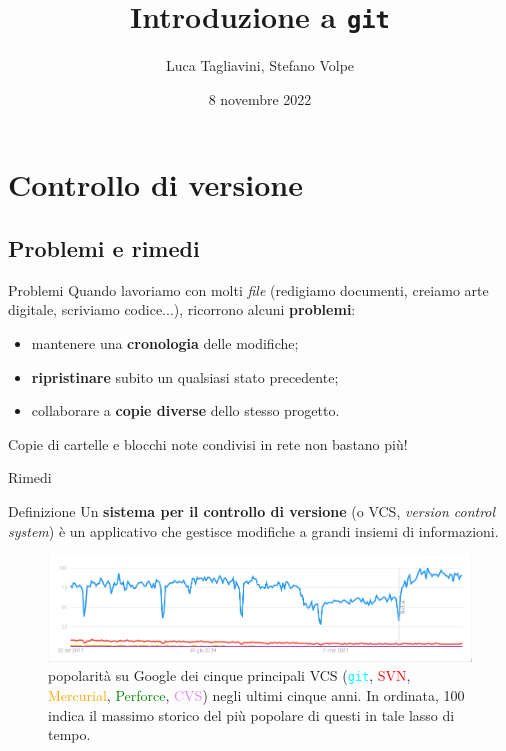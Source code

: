 \documentclass{beamer}
\title{Introduzione a \texttt{git}}
\author{Luca Tagliavini, Stefano Volpe}
\institute{Università di Bologna, corso di Laurea in Informatica}
\date{8 novembre 2022}
\begin{document}
\begin{frame} 
  \titlepage
\end{frame}

\section{Controllo di versione}

\subsection{Problemi e rimedi}
\begin{frame}{Problemi}
  Quando lavoriamo con molti \emph{file} (redigiamo documenti, creiamo arte
  digitale, scriviamo codice...), ricorrono alcuni \textbf{problemi}:\pause
  \begin{itemize}
    \item<1-> mantenere una \textbf{cronologia} delle modifiche;\pause
    \item<2-> \textbf{ripristinare} subito un qualsiasi stato precedente;\pause
    \item<3-> collaborare a \textbf{copie diverse} dello stesso progetto.\pause
  \end{itemize}
  Copie di cartelle e blocchi note condivisi in rete non bastano più!
\end{frame}

\begin{frame}{Rimedi}
  \begin{block}{Definizione}
    Un \textbf{sistema per il controllo di versione} (o VCS, \emph{version control
    system}) è un applicativo che gestisce modifiche a grandi insiemi di
    informazioni.
  \end{block}\pause
  \begin{figure}
    \includegraphics[width=\textwidth]{assets/vcs-popularity.png}
    \caption{popolarità su Google dei cinque principali VCS
    (\textcolor{cyan}{\texttt{git}}, \textcolor{red}{SVN},
    \textcolor{orange}{Mercurial}, \textcolor{green}{Perforce},
    \textcolor{violet}{CVS}) negli ultimi cinque anni. In ordinata, 100 indica il
    massimo storico del più popolare di questi in tale lasso di tempo.}
  \end{figure}
\end{frame}
\end{document}
